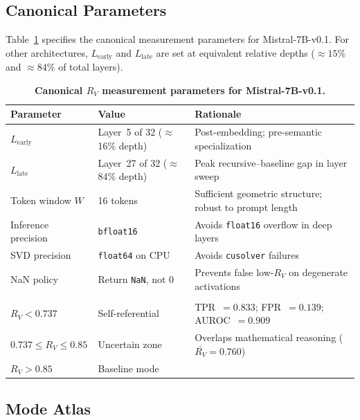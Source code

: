 \documentclass{article}
\newcommand{\RV}{R_V}
\begin{document}
\subsection{Canonical Parameters}

Table~\ref{tab:params} specifies the canonical measurement parameters for Mistral-7B-v0.1.
For other architectures, $L_\mathrm{early}$ and $L_\mathrm{late}$ are set at equivalent relative
depths (${\approx}15\%$ and ${\approx}84\%$ of total layers).

\begin{table}[h]
\centering
\caption{\textbf{Canonical $\RV$ measurement parameters for Mistral-7B-v0.1.}}
\label{tab:params}
\smallskip
\small
\begin{tabular}{>{\raggedright}p{2.8cm}p{3.0cm}p{5.0cm}}
\toprule
\textbf{Parameter} & \textbf{Value} & \textbf{Rationale} \\
\midrule
$L_\mathrm{early}$ & Layer~5 of 32 ($\approx$16\% depth) & Post-embedding; pre-semantic specialization \\
$L_\mathrm{late}$  & Layer~27 of 32 ($\approx$84\% depth) & Peak recursive--baseline gap in layer sweep \\
Token window $W$   & 16 tokens & Sufficient geometric structure; robust to prompt length \\
Inference precision & \texttt{bfloat16} & Avoids \texttt{float16} overflow in deep layers \\
SVD precision      & \texttt{float64} on CPU & Avoids \texttt{cusolver} failures \\
NaN policy         & Return \texttt{NaN}, not 0 & Prevents false low-$\RV$ on degenerate activations \\
\midrule
\multicolumn{3}{l}{\textit{Detection threshold (Mistral-7B only)}} \\
$\RV < 0.737$              & Self-referential & TPR~$= 0.833$; FPR~$= 0.139$; AUROC~$= 0.909$ \\
$0.737 \leq \RV \leq 0.85$ & Uncertain zone   & Overlaps mathematical reasoning ($\bar{\RV} = 0.760$) \\
$\RV > 0.85$               & Baseline mode    & \\
\bottomrule
\end{tabular}
\end{table}

\subsection{Mode Atlas}
\label{sec:modes}
\end{document}
